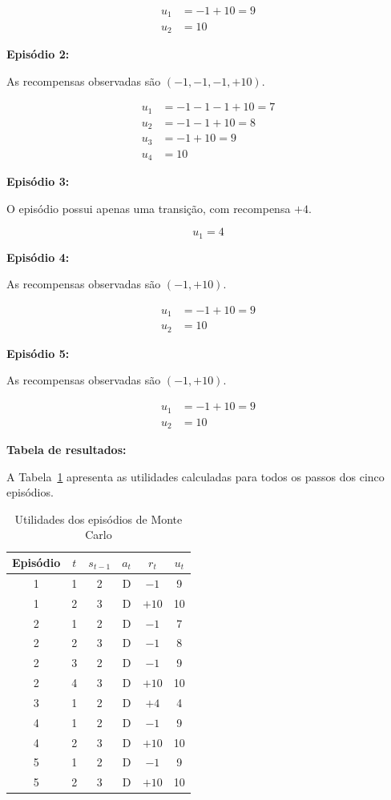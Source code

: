 \[
\begin{aligned}
u_1 &= -1+10=9\\
u_2 &= 10
\end{aligned}
\]

\textbf{Episódio 2:}

As recompensas observadas são
$(-1,-1,-1,+10)$.

\[
\begin{aligned}
u_1 &= -1-1-1+10=7\\
u_2 &= -1-1+10=8\\
u_3 &= -1+10=9\\
u_4 &= 10
\end{aligned}
\]

\textbf{Episódio 3:}

O episódio possui apenas uma transição,
com recompensa $+4$.

\[
    u_1=4
\]

\textbf{Episódio 4:}

As recompensas observadas são $(-1,+10)$.

\[
\begin{aligned}
u_1 &= -1+10=9\\
u_2 &= 10
\end{aligned}
\]

\textbf{Episódio 5:}

As recompensas observadas são $(-1,+10)$.

\[
\begin{aligned}
u_1 &= -1+10=9\\
u_2 &= 10
\end{aligned}
\]

\textbf{Tabela de resultados:}

A Tabela~\ref{tab:utilidades_mc} apresenta
as utilidades calculadas para todos
os passos dos cinco episódios.

\begin{table}[H]
\centering
\caption{Utilidades dos episódios de Monte Carlo}
\label{tab:utilidades_mc}
\begin{tabular}{cccccc}
\toprule
Episódio & $t$ & $s_{t-1}$ & $a_t$ & $r_t$ & $u_t$\\
\midrule
1 & 1 & 2 & D & $-1$ & 9\\
1 & 2 & 3 & D & $+10$ & 10\\
\midrule
2 & 1 & 2 & D & $-1$ & 7\\
2 & 2 & 3 & D & $-1$ & 8\\
2 & 3 & 2 & D & $-1$ & 9\\
2 & 4 & 3 & D & $+10$ & 10\\
\midrule
3 & 1 & 2 & D & $+4$ & 4\\
\midrule
4 & 1 & 2 & D & $-1$ & 9\\
4 & 2 & 3 & D & $+10$ & 10\\
\midrule
5 & 1 & 2 & D & $-1$ & 9\\
5 & 2 & 3 & D & $+10$ & 10\\
\bottomrule
\end{tabular}
\end{table}

